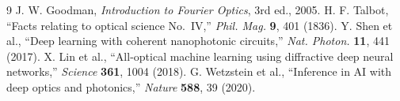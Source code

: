 \documentclass[11pt]{article}
\begin{document}
\begin{thebibliography}{9}\small
{} J. W. Goodman, \emph{Introduction to Fourier Optics}, 3rd ed., 2005.
 H. F. Talbot, ``Facts relating to optical science No.\ IV,'' \emph{Phil. Mag.} \textbf{9}, 401 (1836).
 Y. Shen et al., ``Deep learning with coherent nanophotonic circuits,'' \emph{Nat. Photon.} \textbf{11}, 441 (2017).
 X. Lin et al., ``All-optical machine learning using diffractive deep neural networks,'' \emph{Science} \textbf{361}, 1004 (2018).
 G. Wetzstein et al., ``Inference in AI with deep optics and photonics,'' \emph{Nature} \textbf{588}, 39 (2020).
\end{thebibliography}

\svetochfooter
\end{document}
